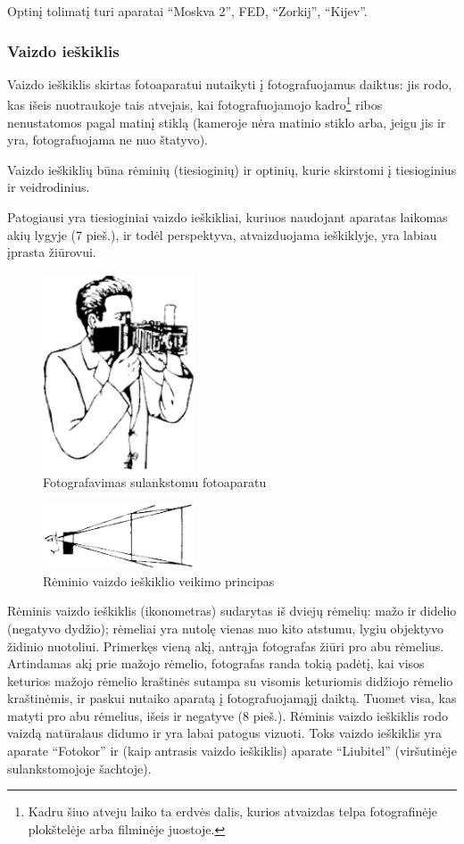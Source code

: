 \documentclass{book}
\begin{document}
					Optinį tolimatį turi aparatai ``Moskva 2'', FED, ``Zorkij'', ``Kijev''.
				\subsubsection*{Vaizdo ieškiklis}
					Vaizdo ieškiklis skirtas fotoaparatui nutaikyti į fotografuojamus daiktus: jis rodo, kas išeis nuotraukoje tais atvejais, kai fotografuojamojo kadro\footnote{Kadru šiuo atveju laiko ta erdvės dalis, kurios atvaizdas telpa fotografinėje plokštelėje arba filminėje juostoje.} ribos nenustatomos pagal matinį stiklą (kameroje nėra matinio stiklo arba, jeigu jis ir yra, fotografuojama ne nuo štatyvo).

					Vaizdo ieškiklių būna rėminių (tiesioginių) ir optinių, kurie skirstomi į tiesioginius ir veidrodinius.

					Patogiausi yra tiesioginiai vaizdo ieškikliai, kuriuos naudojant aparatas laikomas akių lygyje (7 pieš.), ir todėl perspektyva, atvaizduojama ieškiklyje, yra labiau įprasta žiūrovui.
					\begin{figure}[h]
						\centering
						\includegraphics[width=0.4\textwidth]{7-pav}
						\caption{Fotografavimas sulankstomu fotoaparatu}
						\label{fig:7}
					\end{figure}
					\begin{figure}[h]
						\centering
						\includegraphics[width=0.4\textwidth]{8-pav}
						\caption{Rėminio vaizdo ieškiklio veikimo principas}
						\label{fig:8}
					\end{figure}

					Rėminis vaizdo ieškiklis (ikonometras) sudarytas iš dviejų rėmelių: mažo ir didelio (negatyvo dydžio); rėmeliai yra nutolę vienas nuo kito atstumu, lygiu objektyvo židinio nuotoliui. Primerkęs vieną akį, antrąja fotografas žiūri pro abu rėmelius. Artindamas akį prie mažojo rėmelio, fotografas randa tokią padėtį, kai visos keturios mažojo rėmelio kraštinės sutampa su visomis keturiomis didžiojo rėmelio kraštinėmis, ir paskui nutaiko aparatą į fotografuojamąjį daiktą. Tuomet visa, kas matyti pro abu rėmelius, išeis ir negatyve (8 pieš.). Rėminis vaizdo ieškiklis rodo vaizdą natūralaus didumo ir yra labai patogus vizuoti. Toks vaizdo ieškiklis yra aparate ``Fotokor'' ir (kaip antrasis vaizdo ieškiklis) aparate ``Liubitel'' (viršutinėje sulankstomojoje šachtoje).
\end{document}
